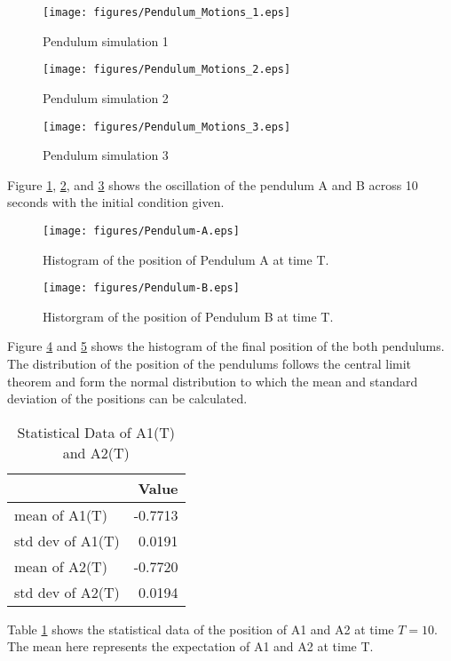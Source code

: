 \documentclass{article}
\begin{document}
\begin{figure}[H]
\centering
\texttt{[image: figures/Pendulum\_Motions\_1.eps]}
\caption{Pendulum simulation 1}
\label{fig:q1-pend-sim-1}
\end{figure}

\begin{figure}[H]
\centering
\texttt{[image: figures/Pendulum\_Motions\_2.eps]}
\caption{Pendulum simulation 2}
\label{fig:q1-pend-sim-2}
\end{figure}

\begin{figure}[H]
\centering
\texttt{[image: figures/Pendulum\_Motions\_3.eps]}
\caption{Pendulum simulation 3}
\label{fig:q1-pend-sim-3}
\end{figure}

Figure \ref{fig:q1-pend-sim-1}, \ref{fig:q1-pend-sim-2}, and \ref{fig:q1-pend-sim-3} shows the oscillation of the pendulum A and B across 10 seconds with the initial condition given.

\begin{figure}[H]
  \centering
  \texttt{[image: figures/Pendulum-A.eps]}
  \caption{Histogram of the position of Pendulum A at time T.}
  \label{fig:figures-Pendulum-A-eps}
\end{figure}

\begin{figure}[H]
  \centering
  \texttt{[image: figures/Pendulum-B.eps]}
  \caption{Historgram of the position of Pendulum B at time T.}
  \label{fig:figures-Pendulum-B-eps}
\end{figure}
Figure \ref{fig:figures-Pendulum-A-eps} and \ref{fig:figures-Pendulum-B-eps} shows the histogram of the final position of the both pendulums. The distribution of the position of the pendulums follows the central limit theorem and form the normal distribution to which the mean and standard deviation of the positions can be calculated. 


\begin{table}[H]
\centering
\caption{Statistical Data of A1(T) and A2(T)}
\label{tab:statistical data a1 a2}
\begin{tabular}{|l|r|}
\hline
\textbf{}       & \textbf{Value} \\
\hline
mean of A1(T)   & -0.7713        \\
std dev of A1(T) & 0.0191         \\
mean of A2(T)   & -0.7720        \\
std dev of A2(T) & 0.0194         \\
\hline
\end{tabular}
\end{table}
Table \ref{tab:statistical data a1 a2} shows the statistical data of the position of A1 and A2 at time $T=10$. The mean here represents the expectation of A1 and A2 at time T.
\end{document}
